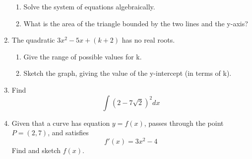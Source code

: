 \documentclass{article}
\begin{document}
\begin{enumerate}
\begin{enumerate}
			\item Solve the system of equations algebraically.
			
			\item What is the area of the triangle bounded by the two lines and the y-axis?
		\end{enumerate}
	
	\item The quadratic $3x^2 - 5x + (k+2)$ has no real roots.
		\begin{enumerate}
			\item Give the range of possible values for k.
			
			\item Sketch the graph, giving the value of the y-intercept (in terms of k).
		\end{enumerate}
	
	\item Find
			$$ \int (2 - 7 \sqrt{2})^2 dx$$
	
	\item Given that a curve has equation $y = f(x)$, passes through the point \\ $P=(2, 7)$, and satisfies
			$$f'(x) = 3x^2 - 4$$
			Find and sketch $f(x)$.
\end{enumerate}
\end{document}
